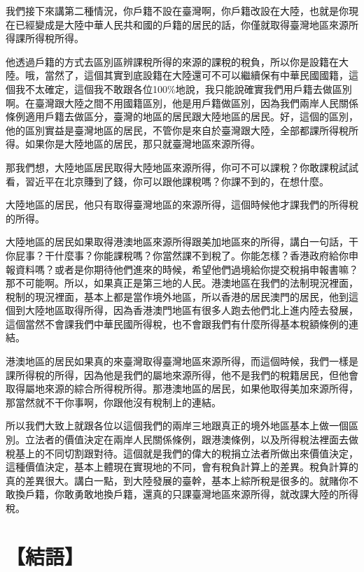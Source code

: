 \documentclass[]{ctexbook}
\begin{document}
我們接下來講第二種情況，你戶籍不設在臺灣啊，你戶籍改設在大陸，也就是你現在已經變成是大陸中華人民共和國的戶籍的居民的話，你僅就取得臺灣地區來源所得課所得稅所得。

他透過戶籍的方式去區別區辨課稅所得的來源的課稅的稅負，所以你是設籍在大陸。哦，當然了，這個其實到底設籍在大陸還可不可以繼續保有中華民國國籍，這個我不太確定，這個我不敢跟各位100\%地說，我只能說確實我們用戶籍去做區別啊。在臺灣跟大陸之間不用國籍區別，他是用戶籍做區別，因為我們兩岸人民關係條例適用戶籍去做區分，臺灣的地區的居民跟大陸地區的居民。好，這個的區別，他的區別實益是臺灣地區的居民，不管你是來自於臺灣跟大陸，全部都課所得稅所得。如果你是大陸地區的居民，那只就臺灣地區來源所得。

那我們想，大陸地區居民取得大陸地區來源所得，你可不可以課稅？你敢課稅試試看，習近平在北京賺到了錢，你可以跟他課稅嗎？你課不到的，在想什麼。

大陸地區的居民，他只有取得臺灣地區的來源所得，這個時候他才課我們的所得稅的所得。

大陸地區的居民如果取得港澳地區來源所得跟美加地區來的所得，講白一句話，干你屁事？干什麼事？你能課稅嗎？你當然課不到稅了。你能怎樣？香港政府給你申報資料嗎？或者是你期待他們進來的時候，希望他們過境給你提交稅捐申報書嘛？那不可能啊。所以，如果真正是第三地的人民。港澳地區在我們的法制現況裡面，稅制的現況裡面，基本上都是當作境外地區，所以香港的居民澳門的居民，他到這個到大陸地區取得所得，因為香港澳門地區有很多人跑去他們北上進内陸去發展，這個當然不會課我們中華民國所得稅，也不會跟我們有什麼所得基本稅額條例的連結。

港澳地區的居民如果真的來臺灣取得臺灣地區來源所得，而這個時候，我們一樣是課所得稅的所得，因為他是我們的屬地來源所得，他不是我們的稅籍居民，但他會取得屬地來源的綜合所得稅所得。那港澳地區的居民，如果他取得美加來源所得，那當然就不干你事啊，你跟他沒有稅制上的連結。

所以我們大致上就跟各位以這個我們的兩岸三地跟真正的境外地區基本上做一個區別。立法者的價值決定在兩岸人民關係條例，跟港澳條例，以及所得稅法裡面去做稅基上的不同切割跟對待。這個就是我們的偉大的稅捐立法者所做出來價值決定，這種價值決定，基本上體現在實現地的不同，會有稅負計算上的差異。稅負計算的真的差異很大。講白一點，到大陸發展的臺幹，基本上綜所稅是很多的。就賭你不敢換戶籍，你敢勇敢地換戶籍，還真的只課臺灣地區來源所得，就改課大陸的所得稅。

\hypertarget{ux7d50ux8a9e}{%
\section{【結語】}\label{ux7d50ux8a9e}}
\end{document}
